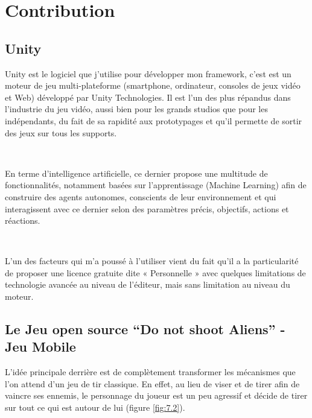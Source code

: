 
\chapter{Contribution} %

\label{Chapter6} %


\section{Unity}

Unity est le logiciel que j'utilise pour développer mon framework, c’est est un moteur de jeu multi-plateforme (smartphone, ordinateur, consoles de jeux vidéo et Web) développé par Unity Technologies. Il est l'un des plus répandus dans l'industrie du jeu vidéo, aussi bien pour les grands studios que pour les indépendants, du fait de sa rapidité aux prototypages et qu'il permette de sortir des jeux sur tous les supports.


~\par
En terme d’intelligence artificielle, ce dernier propose une multitude de fonctionnalités, notamment basées sur l’apprentissage (Machine Learning) afin de construire des agents autonomes, conscients de leur environnement et qui interagissent avec ce dernier selon des paramètres précis, objectifs, actions et réactions.

~\par
L’un des facteurs qui m’a poussé à l’utiliser vient du fait qu'il a la particularité de proposer une licence gratuite dite « Personnelle » avec quelques limitations de technologie avancée au niveau de l'éditeur, mais sans limitation au niveau du moteur.  



\section{Le Jeu open source “Do not shoot Aliens” - Jeu Mobile}

L'idée principale derrière est de complètement transformer les mécanismes que l’on attend d'un jeu de tir classique. En effet, au lieu de viser et de tirer afin de vaincre ses ennemis, le personnage du joueur est un peu agressif et décide de tirer sur tout ce qui est autour de lui (figure \ref{fig:7.2}). 

